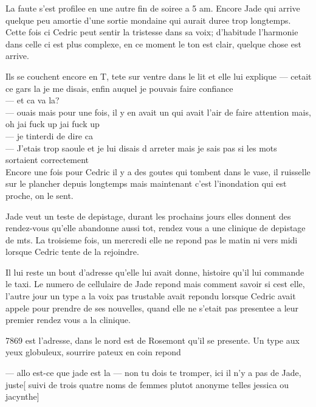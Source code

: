 La faute s'est profilee en une autre fin de soiree a 5 am.
Encore Jade qui arrive quelque peu amortie d'une sortie
mondaine qui aurait duree trop longtemps. Cette fois
ci Cedric peut sentir la tristesse dans sa voix; d'habitude
l'harmonie dans celle ci est plus complexe, en ce moment
le ton est clair, quelque chose est arrive.

Ils se couchent encore en T, tete sur ventre dans le lit
et elle lui explique
--- cetait ce gars la je me disais, enfin auquel je pouvais
faire confiance\\
--- et ca va la?\\
--- ouais mais pour une fois, il y en avait un qui avait l'air
de faire attention mais, oh jai fuck up jai fuck up\\
--- je tinterdi de dire ca\\
--- J'etais trop saoule et je lui disais d arreter mais je sais
pas si les mots sortaient correctement\\

Encore une fois pour Cedric il y a des goutes qui tombent
dans le vase, il ruisselle sur le plancher depuis longtemps
mais maintenant c'est l'inondation qui est proche, on le sent.

Jade veut un teste de depistage, durant les prochains jours
elles donnent des rendez-vous qu'elle abandonne aussi tot,
rendez vous a une clinique de depistage de mts. La troisieme
fois, un mercredi elle ne repond pas le matin ni vers midi lorsque
Cedric tente de la rejoindre.

Il lui reste un bout d'adresse qu'elle lui avait donne, histoire
qu'il lui commande le taxi. Le numero de cellulaire de Jade
repond mais comment savoir si cest elle, l'autre jour un type
a la voix pas trustable avait repondu lorsque Cedric avait appele
pour prendre de ses nouvelles, quand elle ne s'etait pas presentee
a leur premier rendez vous a la clinique.

7869 est l'adresse, dans le nord est de Rosemont qu'il se presente.
Un type aux yeux globuleux, sourrire pateux en coin repond

--- allo est-ce que jade est la
--- non tu dois te tromper, ici il n'y a pas de Jade, juste[ suivi de trois
quatre noms de femmes plutot anonyme telles jessica ou jacynthe]
